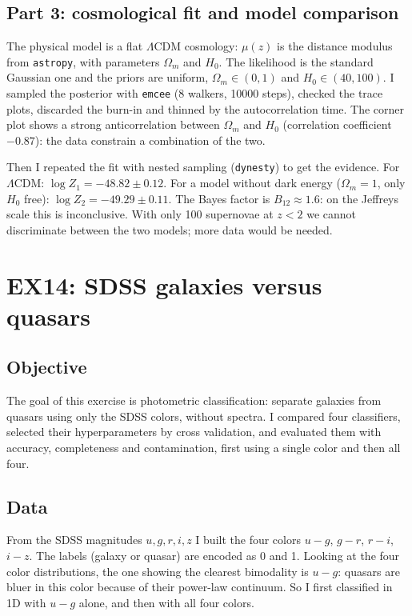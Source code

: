 \documentclass[11pt]{article}
\begin{document}
\subsection*{Part 3: cosmological fit and model comparison}

The physical model is a flat $\Lambda$CDM cosmology: $\mu(z)$ is the distance modulus from \texttt{astropy}, with parameters $\Omega_m$ and $H_0$. The likelihood is the standard Gaussian one and the priors are uniform, $\Omega_m \in (0,1)$ and $H_0 \in (40,100)$. I sampled the posterior with \texttt{emcee} (8 walkers, 10000 steps), checked the trace plots, discarded the burn-in and thinned by the autocorrelation time. The corner plot shows a strong anticorrelation between $\Omega_m$ and $H_0$ (correlation coefficient $-0.87$): the data constrain a combination of the two.

Then I repeated the fit with nested sampling (\texttt{dynesty}) to get the evidence. For $\Lambda$CDM: $\log Z_1 = -48.82 \pm 0.12$. For a model without dark energy ($\Omega_m = 1$, only $H_0$ free): $\log Z_2 = -49.29 \pm 0.11$. The Bayes factor is $B_{12} \approx 1.6$: on the Jeffreys scale this is inconclusive. With only 100 supernovae at $z<2$ we cannot discriminate between the two models; more data would be needed.

\section{EX14: SDSS galaxies versus quasars}

\subsection*{Objective}

The goal of this exercise is photometric classification: separate galaxies from quasars using only the SDSS colors, without spectra. I compared four classifiers, selected their hyperparameters by cross validation, and evaluated them with accuracy, completeness and contamination, first using a single color and then all four.

\subsection*{Data}

From the SDSS magnitudes $u, g, r, i, z$ I built the four colors $u-g$, $g-r$, $r-i$, $i-z$. The labels (galaxy or quasar) are encoded as 0 and 1. Looking at the four color distributions, the one showing the clearest bimodality is $u-g$: quasars are bluer in this color because of their power-law continuum. So I first classified in 1D with $u-g$ alone, and then with all four colors.
\end{document}
